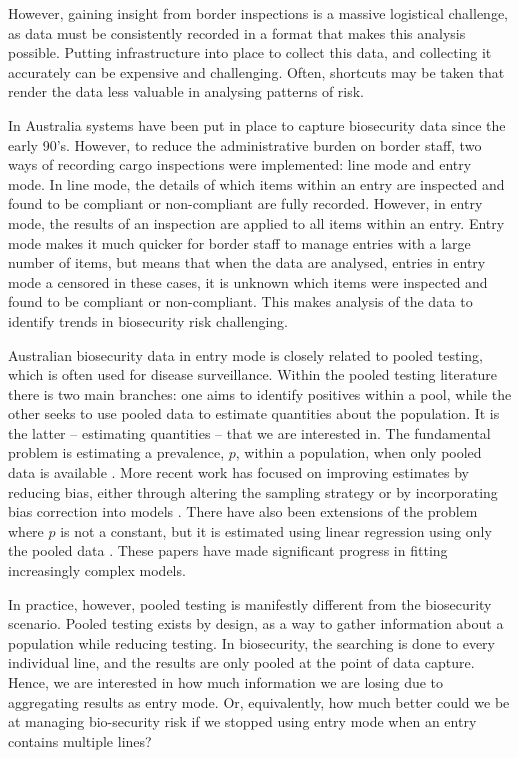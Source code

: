 \documentclass{article}
\begin{document}
However, gaining insight from border inspections is a massive logistical challenge, as data must be consistently recorded in a format that makes this analysis possible. Putting infrastructure into place to collect this data, and collecting it accurately can be expensive and challenging. Often, shortcuts may be taken that render the data less valuable in analysing patterns of risk.

In Australia systems have been put in place to capture biosecurity data since the early 90's. However, to reduce the administrative burden on border staff, two ways of recording cargo inspections were implemented: line mode and entry mode. In line mode, the details of which items within an entry are inspected and found to be compliant or non-compliant are fully recorded. However, in entry mode, the results of an inspection are applied to all items within an entry. Entry mode makes it much quicker for border staff to manage entries with a large number of items, but means that when the data are analysed, entries in entry mode a censored \textemdash{} in these cases, it is unknown which items were inspected and found to be compliant or non-compliant. This makes analysis of the data to identify trends in biosecurity risk challenging.

Australian biosecurity data in entry mode is closely related to pooled testing, which is often used for disease surveillance. Within the pooled testing literature there is two main branches: one aims to identify positives within a pool, while the other seeks to use pooled data to estimate quantities about the population. It is the latter -- estimating quantities -- that we are interested in. The fundamental problem is estimating a prevalence, \(p\), within a population, when only pooled data is available \citep{thompson_estimation_1962}. More recent work has focused on improving estimates by reducing bias, either through altering the sampling strategy \citep{schaarschmidt_experimental_2007,hepworth_debiased_2009} or by incorporating bias correction into models  \citep{hepworth_bias_2017,hepworth_bias_2021}. There have also been extensions of the problem where \(p\) is not a constant, but it is estimated using linear regression using only the pooled data \citep{delaigle_nonparametric_2015, chatterjee_regression_2020, mcmahan_bayesian_2017, liu_generalized_2020}. These papers have made significant progress in fitting increasingly complex models.

In practice, however, pooled testing is manifestly different from the biosecurity scenario. Pooled testing exists by design, as a way to gather information about a population while reducing testing. In biosecurity, the searching is done to every individual line, and the results are only pooled at the point of data capture. Hence, we are interested in how much information we are losing due to aggregating results as entry mode. Or, equivalently, how much better could we be at managing bio-security risk if we stopped using entry mode when an entry contains multiple lines?
\end{document}
